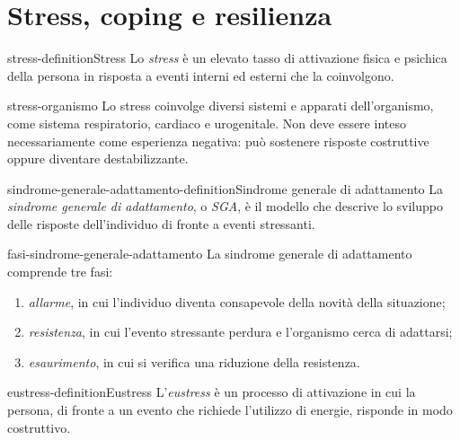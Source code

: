 \documentclass[preview]{standalone}
\begin{document}
\genpage

\section{Stress, coping e resilienza}

\begin{snippetdefinition}{stress-definition}{Stress}
    Lo \emph{stress} è un elevato tasso di attivazione fisica e psichica della
    persona in risposta a eventi interni ed esterni che la coinvolgono.
\end{snippetdefinition}

\begin{snippet}{stress-organismo}
    Lo stress coinvolge diversi sistemi e apparati dell'organismo, come sistema
    respiratorio, cardiaco e urogenitale. Non deve essere inteso
    necessariamente come esperienza negativa: può sostenere risposte costruttive
    oppure diventare destabilizzante.
\end{snippet}

\begin{snippetdefinition}{sindrome-generale-adattamento-definition}{Sindrome generale di adattamento}
    La \emph{sindrome generale di adattamento}, o \emph{SGA}, è il modello che
    descrive lo sviluppo delle risposte dell'individuo di fronte a eventi
    stressanti.
\end{snippetdefinition}

\begin{snippet}{fasi-sindrome-generale-adattamento}
    La sindrome generale di adattamento comprende tre fasi:
    \begin{enumerate}
        \item \emph{allarme}, in cui l'individuo diventa consapevole della
        novità della situazione;
        \item \emph{resistenza}, in cui l'evento stressante perdura e
        l'organismo cerca di adattarsi;
        \item \emph{esaurimento}, in cui si verifica una riduzione della
        resistenza.
    \end{enumerate}
\end{snippet}

\begin{snippetdefinition}{eustress-definition}{Eustress}
    L'\emph{eustress} è un processo di attivazione in cui la persona, di fronte
    a un evento che richiede l'utilizzo di energie, risponde in modo costruttivo.
\end{snippetdefinition}
\end{document}
